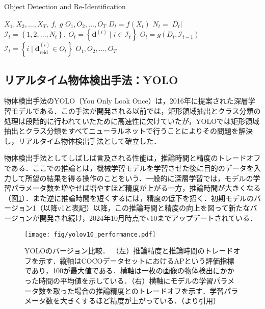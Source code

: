         \begin{algorithm}[t]
            \caption{Object Detection and Re-Identification}
            \label{alg:object_detection_and_reidentification}
            \begin{algorithmic}[1]
                \Require $X_1, X_2, \dots, X_T, ~f, ~g$
                \Ensure $O_1, O_2, \dots, O_T$
                    \State $D_t = f(X_t)$
                    \State $ N_t = \left|D_t\right|$
                        \State $\mathcal{I}_t = \left\{1, 2, \dots, N_t\right\}, ~ O_t = \left\{\bm{d}^{(i)} \mid i \in \mathcal{I}_t\right\}$
                    \Else
                        \State $O_t = g(D_t, \mathcal{I}_{t-1})$
                        \State $\mathcal{I}_t = \left\{i \mid \bm{d}_{\text{reid}}^{(i)} \in O_t\right\}$
                    \EndIf
                \EndFor
                \State \Return $O_1, O_2, \dots, O_T$
            \end{algorithmic}
        \end{algorithm}

    \subsection{リアルタイム物体検出手法：YOLO}
    \label{subsec:object_detection}

    物体検出手法のYOLO（You Only Look Once）\cite{redmon2016you, alif2024yolov1}は，2016年に提案された深層学習モデルである．この手法が開発される以前では，矩形領域抽出とクラス分類の処理は段階的に行われていた\cite{girshick2014rich,girshick2015fast,ren2016faster}ために高速性に欠けていたが，YOLOでは矩形領域抽出とクラス分類をすべてニューラルネットで行うことによりその問題を解決し，リアルタイム物体検出手法として確立した．

    物体検出手法としてしばしば言及される性能は，推論時間と精度のトレードオフである．ここでの推論とは，機械学習モデルを学習させた後に目的のデータを入力して所望の結果を得る操作のことをいう．一般的に深層学習では，モデルの学習パラメータ数を増やせば増やすほど精度が上がる一方，推論時間が大きくなる（図\ref{fig:yolo_tradeoff}）．また逆に推論時間を短くするには，精度の低下を招く．初期モデルのバージョン1（以降v1と表記）以降，この推論時間と精度の向上を図って新たなバージョンが開発され続け，2024年10月時点でv10までアップデートされている．

    \begin{figure}[t]
        \centering
        \texttt{[image: fig/yolov10\_performance.pdf]}
        \caption[YOLOのバージョン比較]{YOLOのバージョン比較．
        （左）推論精度と推論時間のトレードオフを示す．縦軸はCOCOデータセットにおけるAPという評価指標であり，100が最大値である．横軸は一枚の画像の物体検出にかかった時間の平均値を示している．（右）横軸にモデルの学習パラメータ数を取った場合の推論精度とのトレードオフを示す．学習パラメータ数を大きくするほど精度が上がっている．（\cite{wang2024yolov10}より引用）}
        \label{fig:yolo_tradeoff}
    \end{figure}    

